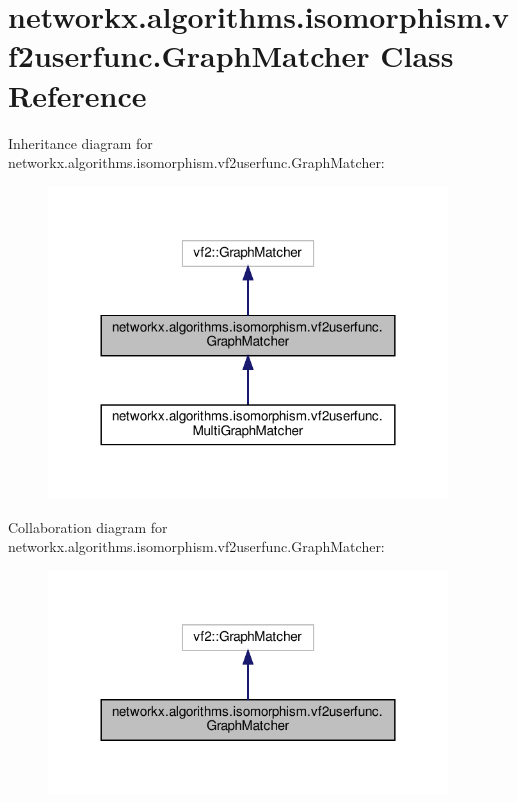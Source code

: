 \hypertarget{classnetworkx_1_1algorithms_1_1isomorphism_1_1vf2userfunc_1_1GraphMatcher}{}\section{networkx.\+algorithms.\+isomorphism.\+vf2userfunc.\+Graph\+Matcher Class Reference}
\label{classnetworkx_1_1algorithms_1_1isomorphism_1_1vf2userfunc_1_1GraphMatcher}


Inheritance diagram for networkx.\+algorithms.\+isomorphism.\+vf2userfunc.\+Graph\+Matcher\+:
\nopagebreak
\begin{figure}[H]
\begin{center}
\leavevmode
\includegraphics[width=300pt]{classnetworkx_1_1algorithms_1_1isomorphism_1_1vf2userfunc_1_1GraphMatcher__inherit__graph}
\end{center}
\end{figure}


Collaboration diagram for networkx.\+algorithms.\+isomorphism.\+vf2userfunc.\+Graph\+Matcher\+:
\nopagebreak
\begin{figure}[H]
\begin{center}
\leavevmode
\includegraphics[width=300pt]{classnetworkx_1_1algorithms_1_1isomorphism_1_1vf2userfunc_1_1GraphMatcher__coll__graph}
\end{center}
\end{figure}
